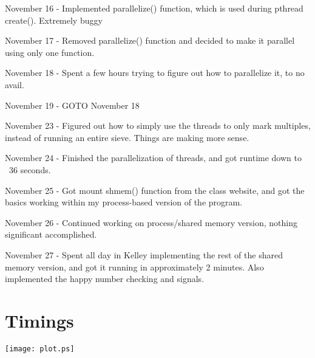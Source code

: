 \documentclass[letterpaper,10pt,titlepage,fleqn]{article}
\begin{document}
November 16 - Implemented parallelize() function, which is used during pthread create(). Extremely buggy

November 17 - Removed parallelize() function and decided to make it parallel using only one function.

November 18 - Spent a few hours trying to figure out how to parallelize it, to no avail.

November 19 - GOTO November 18

November 23 - Figured out how to simply use the threads to only mark multiples, instead of running an entire sieve. Things are making more sense.

November 24 - Finished the parallelization of threads, and got runtime down to ~36 seconds.

November 25 - Got mount shmem() function from the class website, and got the basics working within my process-based version of the program.

November 26 - Continued working on process/shared memory version, nothing significant accomplished.

November 27 - Spent all day in Kelley implementing the rest of the shared memory version, and got it running in approximately 2 minutes. Also implemented the happy number checking and signals.


\section*{Timings}


\vskip 0.04in
\begin{center}
\texttt{[image: plot.ps]}
\end{center}
\end{document}
